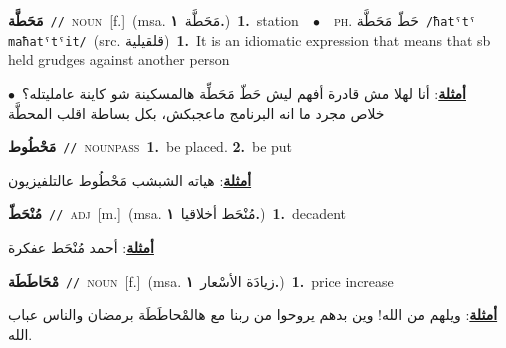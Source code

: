 \documentclass[10pt,a4paper,twoside]{article} %
\begin{document}
\begin{multicols}{2}
{\setlength\topsep{0pt}\textbf{\foreignlanguage{arabic}{مَحَطَّة}}\ {\color{gray}\texttt{//}\color{black}}\ \textsc{noun}\ [f.]\ \color{gray}(msa. \foreignlanguage{arabic}{مَحَطَّة}~\foreignlanguage{arabic}{\textbf{١.}})\color{black}\ \textbf{1.}~station\ \ $\bullet$\ \ \textsc{ph.} \color{gray} \foreignlanguage{arabic}{حَطّ مَحَطَّة}\color{black}\ {\color{gray}\texttt{/{\sffamily ħatˤtˤ maħatˤtˤit}/}\color{black}}\ \color{gray}(src. \foreignlanguage{arabic}{قلقيلية})\color{black}\ \textbf{1.}~It is an idiomatic expression that means that sb held grudges against another person\  \begin{flushright}\color{gray}\foreignlanguage{arabic}{\textbf{\underline{\foreignlanguage{arabic}{أمثلة}}}: أنا لهلا مش قادرة أفهم ليش حَطّ مَحَطِّة هالمسكينة شو كاينة عامليتله؟\ $\bullet$\ \  خلاص مجرد ما انه البرنامج ماعجبكش، بكل بساطة اقلب المحطَّة}\end{flushright}\color{black}} \vspace{2mm}

{\setlength\topsep{0pt}\textbf{\foreignlanguage{arabic}{مَحْطُوط}}\ {\color{gray}\texttt{//}\color{black}}\ \textsc{noun\textunderscore pass}\ \textbf{1.}~be placed.  \textbf{2.}~be put\  \begin{flushright}\color{gray}\foreignlanguage{arabic}{\textbf{\underline{\foreignlanguage{arabic}{أمثلة}}}: هياته الشبشب مَحْطُوط عالتلفيزيون}\end{flushright}\color{black}} \vspace{2mm}

{\setlength\topsep{0pt}\textbf{\foreignlanguage{arabic}{مُنْحَطّ}}\ {\color{gray}\texttt{//}\color{black}}\ \textsc{adj}\ [m.]\ \color{gray}(msa. \foreignlanguage{arabic}{مُنْحَط أخلاقيا}~\foreignlanguage{arabic}{\textbf{١.}})\color{black}\ \textbf{1.}~decadent\  \begin{flushright}\color{gray}\foreignlanguage{arabic}{\textbf{\underline{\foreignlanguage{arabic}{أمثلة}}}: أحمد مُنْحَط عفكرة}\end{flushright}\color{black}} \vspace{2mm}

{\setlength\topsep{0pt}\textbf{\foreignlanguage{arabic}{مْحَاطَطَة}}\ {\color{gray}\texttt{//}\color{black}}\ \textsc{noun}\ [f.]\ \color{gray}(msa. \foreignlanguage{arabic}{زيادَة الأسْعار}~\foreignlanguage{arabic}{\textbf{١.}})\color{black}\ \textbf{1.}~price increase\  \begin{flushright}\color{gray}\foreignlanguage{arabic}{\textbf{\underline{\foreignlanguage{arabic}{أمثلة}}}: ويلهم من الله! وين بدهم يروحوا من ربنا مع هالمْحاطَطَة برمضان والناس عباب الله.}\end{flushright}\color{black}} \vspace{2mm}


\end{multicols}
\end{document}
